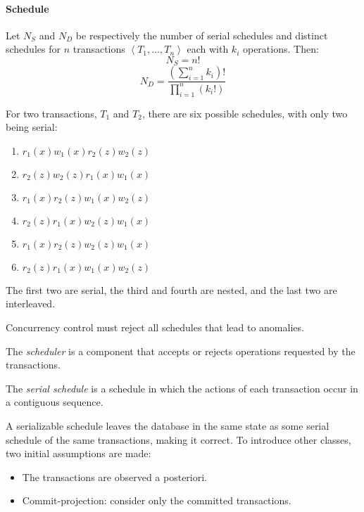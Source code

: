 \paragraph*{Schedule}
Let $N_S$ and $N_D$ be respectively the number of serial schedules and distinct schedules for $n$ transactions $\left\langle T_1,\dots,T_n\right\rangle $ each with $k_i$ operations. 
Then:
\[N_S=n!\]
\[N_D=\dfrac{\left( \sum_{i=1}^nk_i \right)!}{\prod_{i=1}^n \left( k_i! \right)}\]
\begin{example}
    For two transactions, $T_1$ and $T_2$, there are six possible schedules, with only two being serial:
    \begin{enumerate}
        \item $r_1(x) w_1(x) r_2(z) w_2(z)$
        \item $r_2(z) w_2(z) r_1(x) w_1(x)$
        \item $r_1(x) r_2(z) w_1(x) w_2(z)$
        \item $r_2(z) r_1(x) w_2(z) w_1(x)$
        \item $r_1(x) r_2(z) w_2(z) w_1(x)$
        \item $r_2(z) r_1(x) w_1(x) w_2(z)$
    \end{enumerate}
    The first two are serial, the third and fourth are nested, and the last two are interleaved.
\end{example}
Concurrency control must reject all schedules that lead to anomalies.
\begin{definition}
    The \emph{scheduler} is a component that accepts or rejects operations requested by the transactions. 

    The \emph{serial schedule} is a schedule in which the actions of each transaction occur in a contiguous sequence.
\end{definition}
A serializable schedule leaves the database in the same state as some serial schedule of the same transactions, making it correct. 
To introduce other classes, two initial assumptions are made:
\begin{itemize}
    \item The transactions are observed a posteriori. 
    \item Commit-projection: consider only the committed transactions. 
\end{itemize}